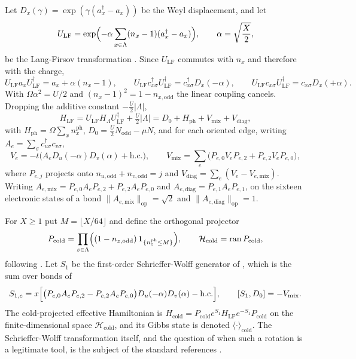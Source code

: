 \documentclass[11pt]{article}
\theoremstyle{definition}
\theoremstyle{remark}
\newcommand{\Nodd}{N_{\mathrm{odd}}}
\newcommand{\cold}{\mathrm{cold}}
\newcommand{\LF}{\mathrm{LF}}
\begin{document}
Let $D_{x}(\gamma)=\exp(\gamma(a_{x}^{\dagger}-a_{x}))$ be the Weyl displacement,
and let
\begin{equation}
U_{\LF}=\exp\Bigl(-\alpha\sum_{x\in\Lambda}(n_{x}-1)(a_{x}^{\dagger}-a_{x})\Bigr),
\qquad \alpha=\sqrt{\frac{X}{2}} ,
\label{eq:ulf}
\end{equation}
be the Lang-Firsov transformation \cite{langfirsov}. Since $U_{\LF}$ commutes with
$n_{x}$ and therefore with the charge,
\begin{equation}
U_{\LF}a_{x}U_{\LF}^{\dagger}=a_{x}+\alpha(n_{x}-1),\qquad
U_{\LF}c_{x\sigma}^{\dagger}U_{\LF}^{\dagger}=c_{x\sigma}^{\dagger}D_{x}(-\alpha),\qquad
U_{\LF}c_{x\sigma}U_{\LF}^{\dagger}=c_{x\sigma}D_{x}(+\alpha).
\label{eq:lfacts}
\end{equation}
With $\Omega\alpha^{2}=U/2$ and $(n_{x}-1)^{2}=1-n_{x,\mathrm{odd}}$ the linear
coupling cancels. Dropping the additive constant $-\tfrac U2|\Lambda|$,
\begin{equation}
H_{\LF}=U_{\LF}H_{\Lambda}U_{\LF}^{\dagger}+\tfrac U2|\Lambda|
=D_{0}+H_{\mathrm{ph}}+V_{\mathrm{mix}}+V_{\mathrm{diag}},
\label{eq:HLF}
\end{equation}
with $H_{\mathrm{ph}}=\Omega\sum_{x}n^{\mathrm{ph}}_{x}$, $D_{0}=\tfrac U2\Nodd-\mu N$,
and for each oriented edge, writing $A_{e}=\sum_{\sigma}c_{u\sigma}^{\dagger}c_{v\sigma}$,
\begin{equation}
V_{e}=-t\bigl(A_{e}D_{u}(-\alpha)D_{v}(\alpha)+\mathrm{h.c.}\bigr),
\qquad V_{\mathrm{mix}}=\sum_{e}\bigl(P_{e,0}V_{e}P_{e,2}+P_{e,2}V_{e}P_{e,0}\bigr),
\label{eq:Ve}
\end{equation}
where $P_{e,j}$ projects onto $n_{u,\mathrm{odd}}+n_{v,\mathrm{odd}}=j$ and
$V_{\mathrm{diag}}=\sum_{e}(V_{e}-V_{e,\mathrm{mix}})$. Writing
$A_{e,\mathrm{mix}}=P_{e,0}A_{e}P_{e,2}+P_{e,2}A_{e}P_{e,0}$ and
$A_{e,\mathrm{diag}}=P_{e,1}A_{e}P_{e,1}$, on the sixteen electronic states of a
bond $\|A_{e,\mathrm{mix}}\|_{\mathrm{op}}=\sqrt2$ and
$\|A_{e,\mathrm{diag}}\|_{\mathrm{op}}=1$.

For $X\ge1$ put $M=\lfloor X/64\rfloor$ and define the orthogonal projector
\begin{equation}
P_{\cold}=\prod_{z\in\Lambda}\Bigl((1-n_{z,\mathrm{odd}})\,
\mathbf{1}_{\{n^{\mathrm{ph}}_{z}\le M\}}\Bigr),
\qquad \mathcal{H}_{\cold}=\operatorname{ran}P_{\cold},
\label{eq:pcold}
\end{equation}
following \cite{largeu}. Let $S_{1}$ be the first-order Schrieffer-Wolff
generator of \cite{largeu}, which is the sum over bonds of
\begin{equation}
S_{1,e}=x\Bigl[\bigl(P_{e,0}A_{e}P_{e,2}-P_{e,2}A_{e}P_{e,0}\bigr)D_{u}(-\alpha)D_{v}(\alpha)-\mathrm{h.c.}\Bigr],
\qquad [S_{1},D_{0}]=-V_{\mathrm{mix}} .
\label{eq:S1}
\end{equation}
The cold-projected effective Hamiltonian is
$H_{\cold}=P_{\cold}e^{S_{1}}H_{\LF}e^{-S_{1}}P_{\cold}$ on the
finite-dimensional space $\mathcal{H}_{\cold}$, and its Gibbs state is denoted
$\langle\cdot\rangle_{\cold}$. The Schrieffer-Wolff transformation itself, and the
question of when such a rotation is a legitimate tool, is the subject of the
standard references \cite{bdl,dff,dls}.
\end{document}
